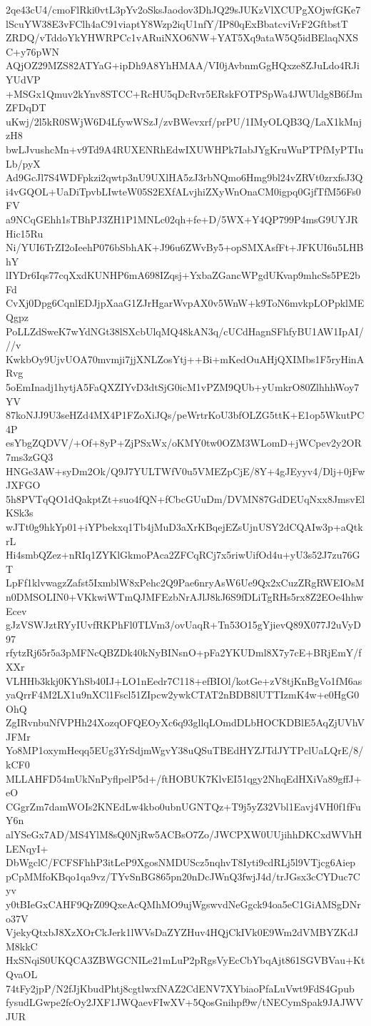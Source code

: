 2qe43cU4/cmoFlRki0vtL3pYv2oSksJaodov3DhJQ29sJUKzVlXCUPgXOjwfGKe7
lScuYW38E3vFClh4aC91viaptY8Wzp2iqU1nfY/IP80qExBbatcviVrF2GftbstT
ZRDQ/vTddoYkYHWRPCc1vARuiNXO6NW+YAT5Xq9ataW5Q5idBElaqNXSC+y76pWN
AQjOZ29MZS82ATYaG+ipDh9A8YhHMAA/VI0jAvbnmGgHQxze8ZJuLdo4RJiYUdVP
+MSGx1Qmuv2kYnv8STCC+RcHU5qDcRvr5ERskFOTPSpWa4JWUldg8B6fJmZFDqDT
uKwj/2l5kR0SWjW6D4LfywWSzJ/zvBWevxrf/prPU/1IMyOLQB3Q/LaX1kMnjzH8
bwLJvushcMn+v9Td9A4RUXENRhEdwIXUWHPk7IabJYgKruWuPTPfMyPTIuLb/pyX
Ad9GcJl7S4WDFpkzi2qwtp3nU9UXlHA5zJ3rbNQmo6Hmg9bl24vZRVt0zrxfsJ3Q
i4vGQOL+UaDiTpvbLIwteW05S2EXfALvjhiZXyWnOnaCM0igpq0GjfTfM56Fs0FV
a9NCqGEhh1sTBhPJ3ZH1P1MNLc02qh+fe+D/5WX+Y4QP799P4msG9UYJRHic15Ru
Ni/YUI6TrZI2oIeehP076bSbhAK+J96u6ZWvBy5+opSMXAsfFt+JFKUI6u5LHBhY
lIYDr6Iqs77cqXxdKUNHP6mA698IZqsj+YxbaZGancWPgdUKvap9mhcSs5PE2bFd
CvXj0Dpg6CqnlEDJjpXaaG1ZJrHgarWvpAX0v5WnW+k9ToN6mvkpLOPpklMEQgpz
PoLLZdSweK7wYdNGt38lSXcbUlqMQ48kAN3q/cUCdHagnSFhfyBU1AW1IpAI///v
KwkbOy9UjvUOA70mvmji7jjXNLZosYtj++Bi+mKedOuAHjQXIMbs1F5ryHinARvg
5oEmInadj1hytjA5FaQXZIYvD3dtSjG0icM1vPZM9QUb+yUmkrO80ZlhhhWoy7YV
87koNJJ9U3seHZd4MX4P1FZoXiJQs/peWrtrKoU3bfOLZG5ttK+E1op5WkutPC4P
esYbgZQDVV/+Of+8yP+ZjPSxWx/oKMY0tw0OZM3WLomD+jWCpev2y2OR7ms3zGQ3
HNGe3AW+syDm2Ok/Q9J7YULTWfV0u5VMEZpCjE/8Y+4gJEyyv4/Dlj+0jFwJXFGO
5h8PVTqQO1dQakptZt+suo4fQN+fCbcGUuDm/DVMN87GdDEUqNxx8JmsvElKSk3s
wJTt0g9hkYp01+iYPbekxq1Tb4jMuD3aXrKBqejEZsUjnUSY2dCQAIw3p+aQtkrL
Hi4smbQZez+nRIq1ZYKlGkmoPAca2ZFCqRCj7x5riwUifOd4u+yU3s52J7zu76GT
LpFf1klvwagzZafst5IxmblW8xPehc2Q9Pae6nryAsW6Ue9Qx2xCuzZRgRWEIOsM
n0DMSOLIN0+VKkwiWTmQJMFEzbNrAJlJ8kJ6S9fDLiTgRHs5rx8Z2EOe4hhwEcev
gJzVSWJztRYyIUvfRKPhFl0TLVm3/ovUaqR+Tn53O15gYjievQ89X077J2uVyD97
rfytzRj65r5a3pMFNcQBZDk40kNyBINsnO+pFa2YKUDml8X7y7cE+BRjEmY/fXXr
VLHHb3kkj0KYhSb40IJ+LO1nEedr7C118+efBIOl/kotGe+zV8tjKnBgVo1fM6as
yaQrrF4M2LX1u9nXCl1Fscl51ZIpcw2ywkCTAT2nBDB8lUTTIzmK4w+e0HgG0OhQ
ZgIRvnbuNfVPHh24XozqOFQEOyXc6q93gllqLOmdDLbHOCKDBlE5AqZjUVhVJFMr
Yo8MP1oxymHeqq5EUg3YrSdjmWgvY38uQSuTBEdHYZJTdJYTPclUaLQrE/8/kCF0
MLLAHFD54mUkNnPyflpelP5d+/ftHOBUK7KlvEI51qgy2NhqEdHXiVa89gffJ+eO
CGgrZm7damWOIs2KNEdLw4kbo0ubnUGNTQz+T9j5yZ32Vbl1Eavj4VH0f1fFuY6n
alYSeGx7AD/MS4YlM8sQ0NjRw5ACBsO7Zo/JWCPXW0UUjihhDKCxdWVhHLENqyI+
DbWgclC/FCFSFhhP3itLeP9XgosNMDUScz5nqhvT8Iyti9cdRLj5l9VTjcg6Aiep
pCpMMfoKBqo1qa9vz/TYvSnBG865pn20nDcJWnQ3fwjJ4d/trJGsx3cCYDuc7Cyv
y0tBIeGxCAHF9QrZ09QxeAcQMhMO9ujWgswvdNeGgck94oa5eC1GiAMSgDNro37V
VjekyQtxbJ8XzXOrCkJerk1lWVsDaZYZHuv4HQjCkIVk0E9Wm2dVMBYZKdJM8kkC
HxSNqiS0UKQCA3ZBWGCNILe21mLuP2pRgsVyEcCbYbqAjt861SGVBVau+KtQvaOL
74tFy2jpP/N2fJjKbudPhtj8cgtlwxfNAZ2CdENV7XYbiaoPfaLuVwt9FdS4Gpub
fysudLGwpe2fcOy2JXF1JWQaevFIwXV+5QosGnihpf9w/tNECymSpak9JAJWVJUR
